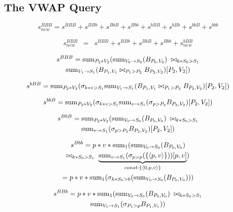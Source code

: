 \subsection{The VWAP Query}


\[
s_{new}^{BBB} =
s^{BBB} +
s^{BBb} +
s^{BbB} +
s^{Bbb} +
s^{bBB} +
s^{bBb} +
s^{bbB} +
s^{bbb}
\]


\begin{eqnarray*}
s_{new}^{BBB} &=&
s^{BBB} +
s^{BBb} +
s^{BbB} +
s^{Bbb} +
s_{new}^{bBB}
\end{eqnarray*}






\begin{multline*}
s^{BBB} =
\mathrm{sum}_{P_2 * V_2}(\mathrm{sum}_{V_0 \rightarrow S_0}(B_{P_0, V_0})
\; \bowtie_{k * S_0 > S_1} \\
\mathrm{sum}_{V_1 \rightarrow S_1}(B_{P_1, V_1} \bowtie_{P_1 > P_2}
B_{P_2, V_2})[P_2, V_2])
\end{multline*}

\begin{multline*}
s^{bBB} =
\mathrm{sum}_{P_2 * V_2}(
\sigma_{k * v > S_1}
\mathrm{sum}_{V_1 \rightarrow S_1}(B_{P_1, V_1} \bowtie_{P_1 > P_2}
B_{P_2, V_2})[P_2, V_2])
\end{multline*}

\begin{multline*}
s^{bbB} =
\mathrm{sum}_{P_2 * V_2}(
\sigma_{k * v > S_1}
\mathrm{sum}_{v \rightarrow S_1}(\sigma_{p > P_2}
B_{P_2, V_2})[P_2, V_2])
\end{multline*}

\begin{multline*}
s^{BbB} =
\mathrm{sum}_{P_2 * V_2}(\mathrm{sum}_{V_0 \rightarrow S_0}(B_{P_0, V_0})
\; \bowtie_{k * S_0 > S_1} \\
\mathrm{sum}_{v \rightarrow S_1}(\sigma_{p > P_2}
B_{P_2, V_2})[P_2, V_2])
\end{multline*}

\begin{multline*}
s^{Bbb} =
p * v * \mathrm{sum}_{1}(\mathrm{sum}_{V_0 \rightarrow S_0}(B_{P_0, V_0})
\\
\bowtie_{k * S_0 > S_1} \;
\underbrace{\mathrm{sum}_{v \rightarrow S_1}(\sigma_{p > p}(\{{\langle p,v\rangle}\}))[p, v]}_{const: \{{\langle0,p,v\rangle} \}}) \\
=
p * v * \mathrm{sum}_{1}(\sigma_{k * S_0 > 0}(
   \mathrm{sum}_{V_0 \rightarrow S_0}(B_{P_0, V_0})))
\end{multline*}


\begin{multline*}
s^{BBb} =
p * v * \mathrm{sum}_{1}(\mathrm{sum}_{V_0 \rightarrow S_0}(B_{P_0, V_0})
\; \bowtie_{k * S_0 > S_1} \\
\mathrm{sum}_{V_1 \rightarrow S_1}(\sigma_{P_1 > p} B_{P_1, V_1}
))
\end{multline*}


